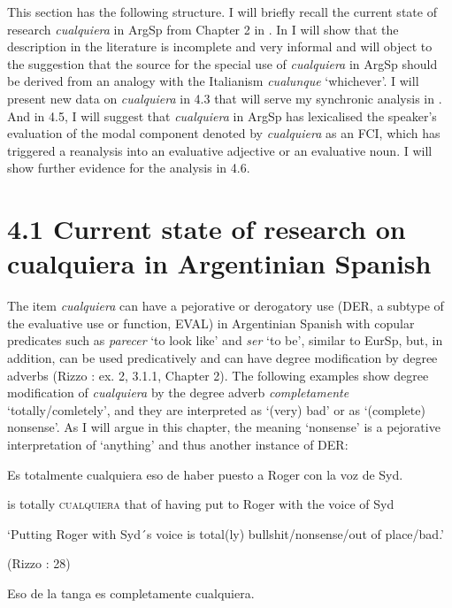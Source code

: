   This section has the following structure. I will briefly recall the current state of research \textit{cualquiera} in ArgSp from Chapter 2 in . In  I will show that the description in the literature is incomplete and very informal and will object to the suggestion that the source for the special use of \textit{cualquiera} in ArgSp should be derived from an analogy with the Italianism \textit{cualunque} ‘whichever’. I will present new data on \textit{cualquiera} in 4.3 that will serve my synchronic analysis in . And in 4.5, I will suggest that \textit{cualquiera} in ArgSp has lexicalised the speaker’s evaluation of the modal component denoted by \textit{cualquiera} as an FCI, which has triggered a reanalysis into an evaluative adjective or an evaluative noun. I will show further evidence for the analysis in 4.6. 

\section{\textbf{4.1} \textbf{Current} \textbf{state} \textbf{of} \textbf{research} \textbf{on \textbf{cualquiera}} \textbf{in} \textbf{Argentinian} \textbf{Spanish}}

The item \textit{cualquiera} can have a pejorative or derogatory use (DER, a subtype of the evaluative use or function, EVAL) in Argentinian Spanish with copular predicates such as \textit{parecer} ‘to look like’ and \textit{ser} ‘to be’, similar to EurSp, but, in addition, can be used predicatively and can have degree modification by degree adverbs (Rizzo \citealt{Salierno2013}: ex. 2, 3.1.1, Chapter 2). The following examples show degree modification of \textit{cualquiera} by the degree adverb \textit{completamente} ‘totally/comletely’, and they are interpreted as ‘(very) bad’ or as ‘(complete) nonsense’. As I will argue in this chapter, the meaning ‘nonsense’ is a pejorative interpretation of ‘anything’ and thus another instance of DER:

    Es  totalmente  cualquiera  eso  de  haber  puesto  a  Roger  con  la  voz  de  Syd.

    is  totally  \textsc{cualquiera}  that  of  having  put  to  Roger  with  the  voice  of  Syd

    ‘Putting Roger with Syd´s voice is total(ly) bullshit/nonsense/out of place/bad.’

    (Rizzo \citealt{Salierno2013}: 28)

    Eso  de  la  tanga  es  completamente  cualquiera.

